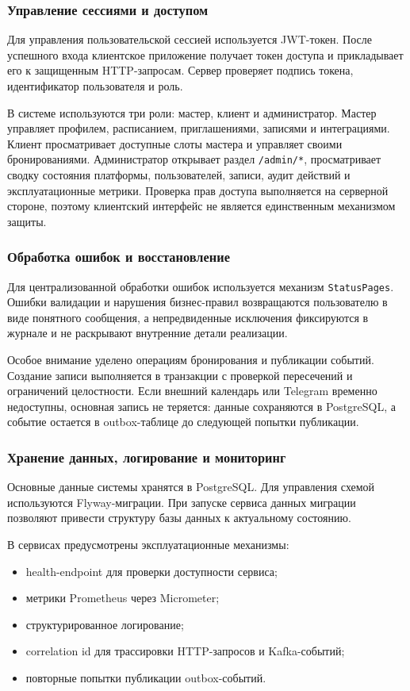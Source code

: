 \subsubsection{Управление сессиями и доступом}

Для управления пользовательской сессией используется JWT-токен. После успешного входа клиентское приложение получает токен доступа и прикладывает его к защищенным HTTP-запросам. Сервер проверяет подпись токена, идентификатор пользователя и роль.

В системе используются три роли: мастер, клиент и администратор. Мастер управляет профилем, расписанием, приглашениями, записями и интеграциями. Клиент просматривает доступные слоты мастера и управляет своими бронированиями. Администратор открывает раздел \texttt{/admin/*}, просматривает сводку состояния платформы, пользователей, записи, аудит действий и эксплуатационные метрики. Проверка прав доступа выполняется на серверной стороне, поэтому клиентский интерфейс не является единственным механизмом защиты.

\subsubsection{Обработка ошибок и восстановление}

Для централизованной обработки ошибок используется механизм \texttt{StatusPages}. Ошибки валидации и нарушения бизнес-правил возвращаются пользователю в виде понятного сообщения, а непредвиденные исключения фиксируются в журнале и не раскрывают внутренние детали реализации.

Особое внимание уделено операциям бронирования и публикации событий. Создание записи выполняется в транзакции с проверкой пересечений и ограничений целостности. Если внешний календарь или Telegram временно недоступны, основная запись не теряется: данные сохраняются в PostgreSQL, а событие остается в outbox-таблице до следующей попытки публикации.

\subsubsection{Хранение данных, логирование и мониторинг}

Основные данные системы хранятся в PostgreSQL. Для управления схемой используются Flyway-миграции. При запуске сервиса данных миграции позволяют привести структуру базы данных к актуальному состоянию.

В сервисах предусмотрены эксплуатационные механизмы:
\begin{itemize}
\item health-endpoint для проверки доступности сервиса;
\item метрики Prometheus через Micrometer;
\item структурированное логирование;
\item correlation id для трассировки HTTP-запросов и Kafka-событий;
\item повторные попытки публикации outbox-событий.
\end{itemize}

